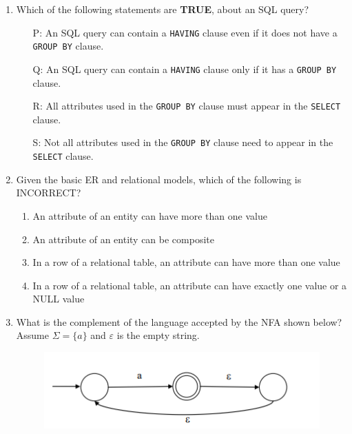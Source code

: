 \documentclass[journal]{IEEEtran}
\numberwithin{equation}{enumi}
\numberwithin{figure}{enumi}
\begin{document}
\begin{enumerate}
\item Which of the following statements are \textbf{TRUE}, about an SQL query?

\begin{enumerate}
    \item[P:] An SQL query can contain a \texttt{HAVING} clause even if it does not have a \texttt{GROUP BY} clause.
    \item[Q:] An SQL query can contain a \texttt{HAVING} clause only if it has a \texttt{GROUP BY} clause.
    \item[R:] All attributes used in the \texttt{GROUP BY} clause must appear in the \texttt{SELECT} clause.
    \item[S:] Not all attributes used in the \texttt{GROUP BY} clause need to appear in the \texttt{SELECT} clause.
\end{enumerate}

\begin{enumerate}
\end{enumerate}

\item Given the basic ER and relational models, which of the following is INCORRECT? 
\begin{enumerate}
    \item An attribute of an entity can have more than one value
    \item An attribute of an entity can be composite
    \item In a row of a relational table, an attribute can have more than one value
    \item In a row of a relational table, an attribute can have exactly one value or a NULL value 
\end{enumerate}

\item What is the complement of the language accepted by the NFA shown below?  
Assume $\Sigma = \{a\}$ and $\varepsilon$ is the empty string.
\begin{figure}[H]
    \centering
    \includegraphics[width=0.5\columnwidth]{figs/New folder (2)/fig1.png}
    \caption{}
    \label{fig:3}
   \end{figure}
\begin{enumerate}
\end{enumerate}


\end{enumerate}
\end{document}
